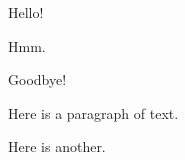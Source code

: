 \documentclass{article}
\begin{document}
\hbox{Hello!}

\prehboxhooks
{}\posthboxhooks
{}
\hbox{Hmm.}
\prehboxhooks
{}\posthboxhooks

\hbox{Goodbye!}
\everyhbox{}

Here is a paragraph of text.

Here is another.
\end{document}
